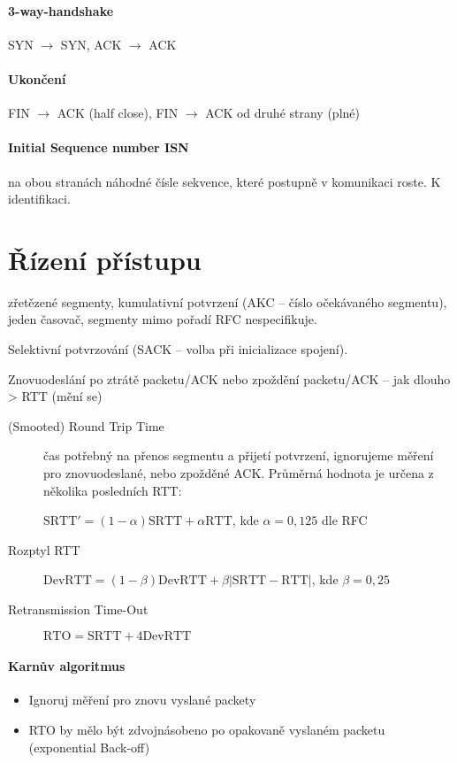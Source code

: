 \documentclass[a4paper, 11pt]{report}
\begin{document}
\paragraph{3-way-handshake} SYN $\to$ SYN, ACK $\to$ ACK

\paragraph{Ukončení} FIN $\to$ ACK (half close), FIN $\to$ ACK od druhé strany (plné)

\paragraph{Initial Sequence number ISN} na obou stranách náhodné čísle sekvence, které postupně v komunikaci roste. K identifikaci.

\section{Řízení přístupu}
zřetězené segmenty, kumulativní potvrzení (AKC -- číslo očekávaného segmentu), jeden časovač, segmenty mimo pořadí RFC nespecifikuje.

Selektivní potvrzování (SACK -- volba při inicializace spojení).

Znovuodeslání po ztrátě packetu/ACK nebo zpoždění packetu/ACK -- jak dlouho > RTT (mění se)

\begin{description}
	\item[(Smooted) Round Trip Time] čas potřebný na přenos segmentu a přijetí potvrzení, ignorujeme měření pro znovuodeslané, nebo zpožděné ACK. Průměrná hodnota je určena z několika posledních RTT:
	
	$\text{SRTT}' = (1 - \alpha) \text{SRTT} + \alpha \text{RTT}$, kde $\alpha = 0,125$ dle RFC 
	
	\item[Rozptyl RTT] $\text{DevRTT} = (1 - \beta) \text{DevRTT} + \beta | \text{SRTT} - \text{RTT} |$, kde $\beta = 0,25$
	
	\item[Retransmission Time-Out] $\text{RTO} = \text{SRTT} + 4 \text{DevRTT}$
\end{description}

\paragraph{Karnův algoritmus}
\begin{itemize}
	\item Ignoruj měření pro znovu vyslané packety
	\item RTO by mělo být zdvojnásobeno po opakovaně vyslaném packetu (exponential Back-off)
\end{itemize}
\end{document}
